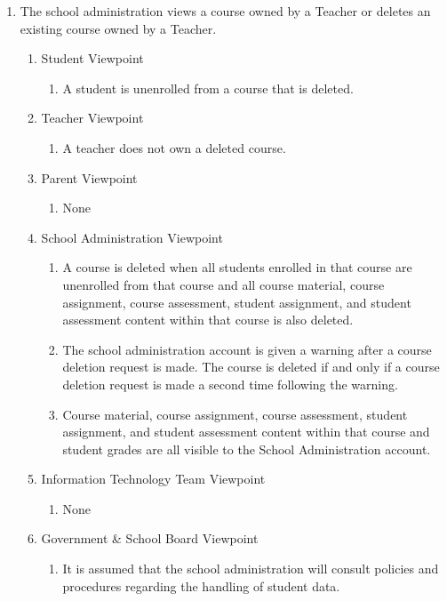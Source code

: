 \documentclass[]{article}
\begin{document}
\begin{enumerate}[{BE}1.]
	\item The school administration views a course owned by a Teacher or deletes an existing course owned by a Teacher.
	\begin{enumerate}[{VP1}.1]
		\item Student Viewpoint
			\begin{enumerate}
				\item A student is unenrolled from a course that is deleted.
			\end{enumerate}
		\item Teacher Viewpoint
			\begin{enumerate}
				\item A teacher does not own a deleted course.
			\end{enumerate}
		\item Parent Viewpoint
			\begin{enumerate}
				\item None
			\end{enumerate}
		\item School Administration Viewpoint
			\begin{enumerate}
				\item A course is deleted when all students enrolled in that course are unenrolled from that course and all course material, course assignment, course assessment, student assignment, and student assessment content within that course is also deleted.
				\item The school administration account is given a warning after a course deletion request is made. The course is deleted if and only if a course deletion request is made a second time following the warning.
				\item Course material, course assignment, course assessment, student assignment, and student assessment content within that course and student grades are all visible to the School Administration account.
			\end{enumerate}
		\item Information Technology Team Viewpoint
			\begin{enumerate}
				\item None
			\end{enumerate}
		\item Government \& School Board Viewpoint
			\begin{enumerate}
				\item It is assumed that the school administration will consult policies and procedures regarding the handling of student data.
			\end{enumerate}
	\end{enumerate}


\end{enumerate}
\end{document}
